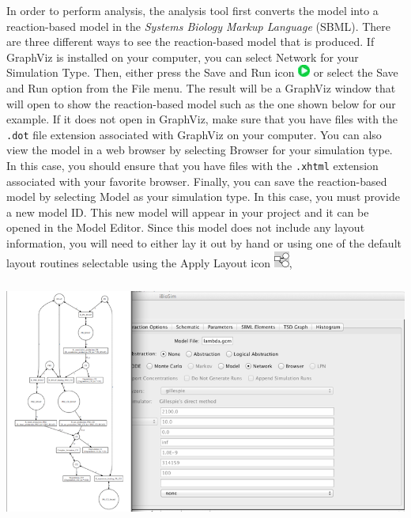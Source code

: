 \documentclass[titlepage,11pt]{article}
\begin{document}
In order to perform analysis, the analysis tool first converts the model into a reaction-based model in the \emph{Systems Biology Markup Language} (SBML).  There are three different ways to see the reaction-based model that is produced.  If GraphViz is installed on your computer, you can select Network for your Simulation Type.  Then, either press the Save and Run icon \includegraphics{../gui/icons/run-icon} or select the Save and Run option from the File menu.  The result will be a GraphViz window that will open to show the reaction-based model such as the one shown below for our example.  If it does not open in GraphViz, make sure that you have files with the {\tt .dot} file extension associated with GraphViz on your computer.  You can also view the model in a web browser by selecting Browser for your simulation type.  In this case, you should ensure that you have files with the {\tt .xhtml} extension associated with your favorite browser.  Finally, you can save the reaction-based model by selecting Model as your simulation type.  In this case, you must provide a new model ID.  This new model will appear in your project and it can be opened in the Model Editor.  Since this model does not include any layout information, you will need to either lay it out by hand or using one of the default layout routines selectable using the Apply Layout icon \includegraphics{../gui/icons/modelview/choose_layout_selected},

\begin{center}
\includegraphics[height=80mm]{screenshots/viewNetwork}
\end{center}
\end{document}
